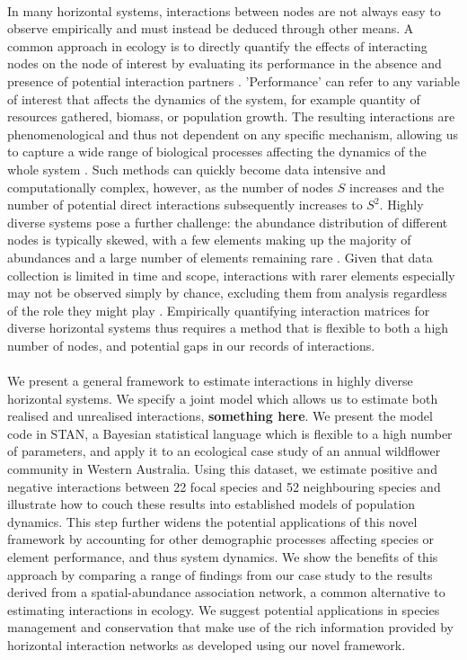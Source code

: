 \documentclass[a4,12pt]{article}
\begin{document}
    \paragraph{} 
    In many horizontal systems, interactions between nodes are not always easy to observe empirically and must instead be deduced through other means. A common approach in ecology is to directly quantify the effects of interacting nodes on the node of interest by evaluating its performance in the absence and presence of potential interaction partners \parencite{Connell1961, Grace1990}. 'Performance' can refer to any variable of interest that affects the dynamics of the system, for example quantity of resources gathered, biomass, or population growth. The resulting interactions are phenomenological and thus not dependent on any specific mechanism, allowing us to capture a wide range of biological processes affecting the dynamics of the whole system \parencite{Novak2010}. Such methods can quickly become data intensive and computationally complex, however, as the number of nodes $S$ increases and the number of potential direct interactions subsequently increases to $S^2$. Highly diverse systems pose a further challenge: the abundance distribution of different nodes is typically skewed, with a few elements making up the majority of abundances and a large number of elements remaining rare \parencite{Fisher1943}. Given that data collection is limited in time and scope, interactions with rarer elements especially may not be observed simply by chance, excluding them from analysis regardless of the role they might play \parencite{Olesen2011}. Empirically quantifying interaction matrices for diverse horizontal systems thus requires a method that is flexible to both a high number of nodes, and potential gaps in our records of interactions. 


    \paragraph{} 
    We present a general framework to estimate interactions in highly diverse horizontal systems. We specify a joint model which allows us to estimate both realised and unrealised interactions, \textbf{something here}. We present the model code in STAN, a Bayesian statistical language which is flexible to a high number of parameters, and apply it to an ecological case study of an annual wildflower community in Western Australia. Using this  dataset, we estimate positive and negative interactions between 22 focal species and 52 neighbouring species and illustrate how to couch these results into established models of population dynamics. This step further widens the potential applications of this novel framework by accounting for other demographic processes affecting species or element performance, and thus system dynamics. We show the benefits of this approach by comparing a range of findings from our case study to the results derived from a spatial-abundance association network, a common alternative to estimating interactions in ecology. We suggest potential applications in species management and conservation that make use of the rich information provided by horizontal interaction networks as developed using our novel framework.
\end{document}
